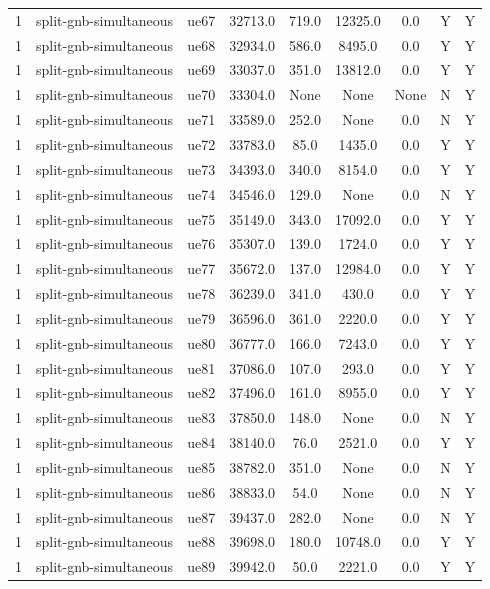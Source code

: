 \begin{table}[ht]
\begin{tabular}{|c|c|c|c|c|c|c|c|c|}
1 & split-gnb-simultaneous & ue67 & 32713.0 & 719.0 & 12325.0 & 0.0 & Y & Y \\
1 & split-gnb-simultaneous & ue68 & 32934.0 & 586.0 & 8495.0 & 0.0 & Y & Y \\
1 & split-gnb-simultaneous & ue69 & 33037.0 & 351.0 & 13812.0 & 0.0 & Y & Y \\
1 & split-gnb-simultaneous & ue70 & 33304.0 & None & None & None & N & Y \\
1 & split-gnb-simultaneous & ue71 & 33589.0 & 252.0 & None & 0.0 & N & Y \\
1 & split-gnb-simultaneous & ue72 & 33783.0 & 85.0 & 1435.0 & 0.0 & Y & Y \\
1 & split-gnb-simultaneous & ue73 & 34393.0 & 340.0 & 8154.0 & 0.0 & Y & Y \\
1 & split-gnb-simultaneous & ue74 & 34546.0 & 129.0 & None & 0.0 & N & Y \\
1 & split-gnb-simultaneous & ue75 & 35149.0 & 343.0 & 17092.0 & 0.0 & Y & Y \\
1 & split-gnb-simultaneous & ue76 & 35307.0 & 139.0 & 1724.0 & 0.0 & Y & Y \\
1 & split-gnb-simultaneous & ue77 & 35672.0 & 137.0 & 12984.0 & 0.0 & Y & Y \\
1 & split-gnb-simultaneous & ue78 & 36239.0 & 341.0 & 430.0 & 0.0 & Y & Y \\
1 & split-gnb-simultaneous & ue79 & 36596.0 & 361.0 & 2220.0 & 0.0 & Y & Y \\
1 & split-gnb-simultaneous & ue80 & 36777.0 & 166.0 & 7243.0 & 0.0 & Y & Y \\
1 & split-gnb-simultaneous & ue81 & 37086.0 & 107.0 & 293.0 & 0.0 & Y & Y \\
1 & split-gnb-simultaneous & ue82 & 37496.0 & 161.0 & 8955.0 & 0.0 & Y & Y \\
1 & split-gnb-simultaneous & ue83 & 37850.0 & 148.0 & None & 0.0 & N & Y \\
1 & split-gnb-simultaneous & ue84 & 38140.0 & 76.0 & 2521.0 & 0.0 & Y & Y \\
1 & split-gnb-simultaneous & ue85 & 38782.0 & 351.0 & None & 0.0 & N & Y \\
1 & split-gnb-simultaneous & ue86 & 38833.0 & 54.0 & None & 0.0 & N & Y \\
1 & split-gnb-simultaneous & ue87 & 39437.0 & 282.0 & None & 0.0 & N & Y \\
1 & split-gnb-simultaneous & ue88 & 39698.0 & 180.0 & 10748.0 & 0.0 & Y & Y \\
1 & split-gnb-simultaneous & ue89 & 39942.0 & 50.0 & 2221.0 & 0.0 & Y & Y \\

\end{tabular}
\end{table}
